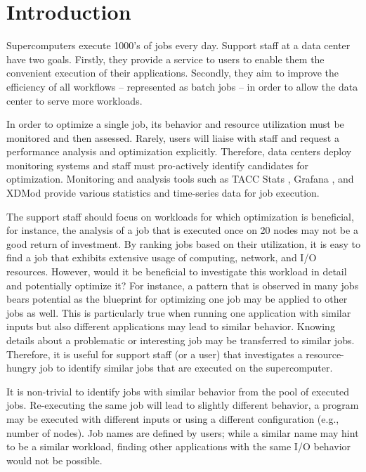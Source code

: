 \documentclass{jhps}
\begin{document}
\section{Introduction}

Supercomputers execute 1000's of jobs every day.
Support staff at a data center have two goals.
Firstly, they provide a service to users to enable them the convenient execution of their applications.
Secondly, they aim to improve the efficiency of all workflows -- represented as batch jobs -- in order to allow the data center to serve more workloads.

In order to optimize a single job, its behavior and resource utilization must be monitored and then assessed.
Rarely, users will liaise with staff and request a performance analysis and optimization explicitly.
Therefore, data centers deploy monitoring systems and staff must pro-actively identify candidates for optimization.
Monitoring and analysis tools such as TACC Stats \cite{evans2014comprehensive}, Grafana \cite{chan2019resource}, and XDMod \cite{simakov2018workload} provide various statistics and time-series data for job execution.

The support staff should focus on workloads for which optimization is beneficial, for instance, the analysis of a job that is executed once on 20 nodes may not be a good return of investment.
By ranking jobs based on their utilization, it is easy to find a job that exhibits extensive usage of computing, network, and I/O resources.
However, would it be beneficial to investigate this workload in detail and potentially optimize it?
For instance, a pattern that is observed in many jobs bears potential as the blueprint for optimizing one job may be applied to other jobs as well.
This is particularly true when running one application with similar inputs but also different applications may lead to similar behavior.
Knowing details about a problematic or interesting job may be transferred to similar jobs.
Therefore, it is useful for support staff (or a user) that investigates a resource-hungry job to identify similar jobs that are executed on the supercomputer.

It is non-trivial to identify jobs with similar behavior from the pool of executed jobs.
Re-executing the same job will lead to slightly different behavior, a program may be executed with different inputs or using a different configuration (e.g., number of nodes).
Job names are defined by users; while a similar name may hint to be a similar workload, finding other applications with the same I/O behavior would not be possible.
\end{document}
